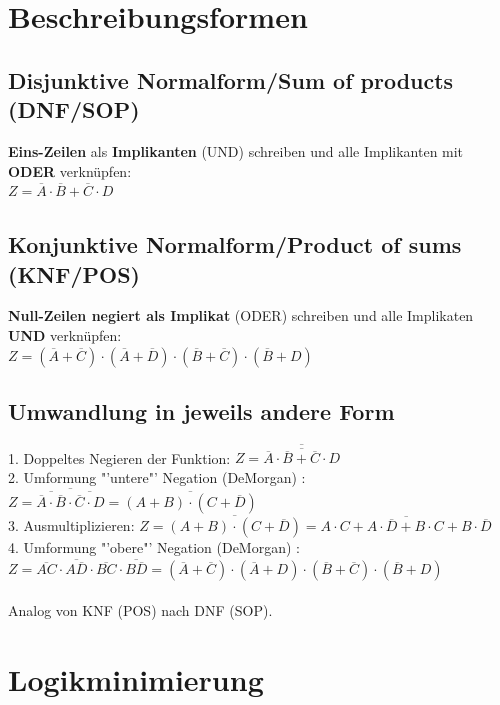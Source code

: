 \documentclass[6pt,a4paper]{scrartcl}
\newcommand{\ol}[1]{\ensuremath{\overline{#1}}}									%
\begin{document}
\begin{multicols*}{3}
\section{Beschreibungsformen}
	\subsection{Disjunktive Normalform/Sum of products (DNF/SOP)}
	\textbf{Eins-Zeilen} als \textbf{Implikanten} (UND) schreiben und alle Implikanten mit \textbf{ODER} verknüpfen: \\
	$Z = \overline A \cdot \overline B + \overline C \cdot D$ 
	
	\subsection{Konjunktive Normalform/Product of sums (KNF/POS)}
	\textbf{Null-Zeilen negiert als Implikat} (ODER)  schreiben und alle Implikaten \textbf{UND} verknüpfen: \\	
	$Z = ( \ol A + \ol C) \cdot ( \ol A + \ol D) \cdot ( \ol B + \ol C) \cdot ( \ol B + D)$
	
	\subsection{Umwandlung in jeweils andere Form}
	1. Doppeltes Negieren der Funktion: $ Z = \overline {\overline{\overline A \cdot \overline B + \overline C \cdot D}}$\\
	2. Umformung "'untere"'  Negation (DeMorgan) : $ Z = \ol{\ol{\ol A \cdot \ol B} \cdot \ol{\ol C \cdot D}} = \ol{(A+B) \cdot (C+\ol D)}$\\
	3. Ausmultiplizieren: $ Z = \ol{(A+B) \cdot (C+\ol D)} = \ol{A\cdot C + A\cdot \ol D + B \cdot C + B \cdot \ol D}$\\
	4. Umformung "'obere"'  Negation (DeMorgan) :\\ $ Z= \ol{AC} \cdot \ol{A \ol D} \cdot \ol{BC} \cdot \ol{B\ol D} = ( \ol A + \ol C) \cdot ( \ol A + D) \cdot ( \ol B + \ol C) \cdot ( \ol B + D)$\\ \\
	Analog von KNF (POS) nach DNF (SOP).
	
\section{Logikminimierung}

\end{multicols*}
\end{document}
